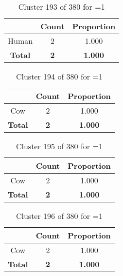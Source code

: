 \begin{table}[ht!]
\centering
\begin{tabular}{|c|c|c|}
\hline
\bf \Spec{} &\bf Count &\bf Proportion\\ \hline \hline
Human & 2 & 1.000\\ \hline
\hline
\bf Total & \bf 2 & \bf 1.000\\ \hline
\end{tabular}
\label{tab:cluster:193:1}
\caption{Cluster 193 of 380 for \minneigh{}=1}
\end{table}

\begin{table}[ht!]
\centering
\begin{tabular}{|c|c|c|}
\hline
\bf \Spec{} &\bf Count &\bf Proportion\\ \hline \hline
Cow & 2 & 1.000\\ \hline
\hline
\bf Total & \bf 2 & \bf 1.000\\ \hline
\end{tabular}
\label{tab:cluster:194:1}
\caption{Cluster 194 of 380 for \minneigh{}=1}
\end{table}

\begin{table}[ht!]
\centering
\begin{tabular}{|c|c|c|}
\hline
\bf \Spec{} &\bf Count &\bf Proportion\\ \hline \hline
Cow & 2 & 1.000\\ \hline
\hline
\bf Total & \bf 2 & \bf 1.000\\ \hline
\end{tabular}
\label{tab:cluster:195:1}
\caption{Cluster 195 of 380 for \minneigh{}=1}
\end{table}

\begin{table}[ht!]
\centering
\begin{tabular}{|c|c|c|}
\hline
\bf \Spec{} &\bf Count &\bf Proportion\\ \hline \hline
Cow & 2 & 1.000\\ \hline
\hline
\bf Total & \bf 2 & \bf 1.000\\ \hline
\end{tabular}
\label{tab:cluster:196:1}
\caption{Cluster 196 of 380 for \minneigh{}=1}
\end{table}

